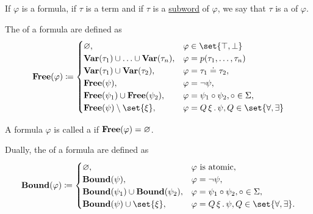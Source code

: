 \begin{definition}
\begin{thmenum}
     If \( \varphi \) is a formula, if \( \tau \) is a term and if \( \tau \) is a \hyperref[def:language/subword]{subword} of \( \varphi \), we say that \( \tau \) is a  of \( \varphi \).

     The  of a formula are defined as
    \begin{equation}\label{eq:def:first_order_syntax/formula_free_variables}
      \boldop{Free}(\varphi) \coloneqq \begin{cases}
        \varnothing,                                                &\varphi \in \set{ \top, \bot } \\
        \boldop{Var}(\tau_1) \cup \ldots \cup \boldop{Var}(\tau_n), &\varphi = p(\tau_1, \ldots, \tau_n) \\
        \boldop{Var}(\tau_1) \cup \boldop{Var}(\tau_2),             &\varphi = \tau_1 \doteq \tau_2, \\
        \boldop{Free}(\psi),                                        &\varphi = \neg \psi, \\
        \boldop{Free}(\psi_1) \cup \boldop{Free}(\psi_2),           &\varphi = \psi_1 \bincirc \psi_2, \bincirc \in \Sigma, \\
        \boldop{Free}(\psi) \setminus \set{ \xi },                  &\varphi = \quantifier{Q}{\xi} \psi, Q \in \set{ \forall, \exists }
      \end{cases}
    \end{equation}

     A formula \( \varphi \) is called a  if \( \operatorname{\mathbf{Free}}(\varphi) = \varnothing \).

     Dually, the  of a formula are defined as
    \begin{equation}\label{eq:def:first_order_syntax/formula_bound_variables}
      \boldop{Bound}(\varphi) \coloneqq \begin{cases}
        \varnothing,                                        &\varphi \text{ is atomic}, \\
        \boldop{Bound}(\psi),                               &\varphi = \neg \psi, \\
        \boldop{Bound}(\psi_1) \cup \boldop{Bound}(\psi_2), &\varphi = \psi_1 \bincirc \psi_2, \bincirc \in \Sigma, \\
        \boldop{Bound}(\psi) \cup \set{ \xi },              &\varphi = \quantifier{Q}{\xi} \psi, Q \in \set{ \forall, \exists }.
      \end{cases}
    \end{equation}


\end{thmenum}
\end{definition}
